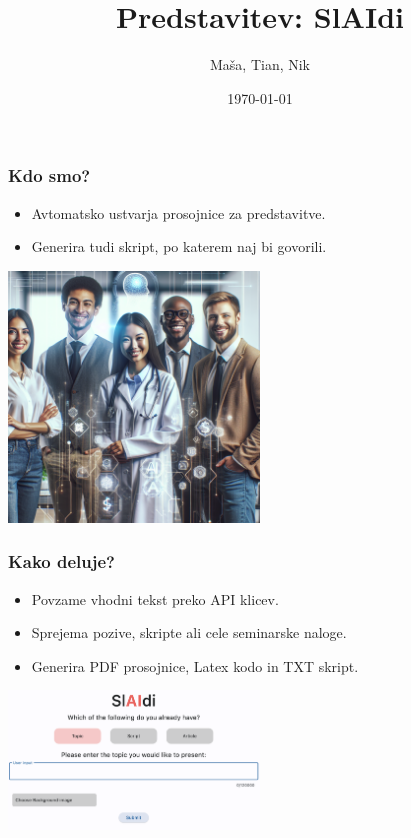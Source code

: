 \documentclass{beamer}
\title{Predstavitev: SlAIdi}
\author{Maša, Tian, Nik}
\institute{Univerza}
\date{\today}
\begin{document}
\begin{frame}
\titlepage
\end{frame}

\begin{frame}
\frametitle{Kdo smo?}
\begin{itemize}
    \item Avtomatsko ustvarja prosojnice za predstavitve.
    \item Generira tudi skript, po katerem naj bi govorili.
\end{itemize}
\centering
\includegraphics[width=0.5\textwidth]{./images/team.png}
\end{frame}

\begin{frame}
\frametitle{Kako deluje?}
\begin{itemize}
    \item Povzame vhodni tekst preko API klicev.
    \item Sprejema pozive, skripte ali cele seminarske naloge.
    \item Generira PDF prosojnice, Latex kodo in TXT skript.
\end{itemize}
\centering
\includegraphics[width=0.5\textwidth]{./images/workflow.png}
\end{frame}
\end{document}
